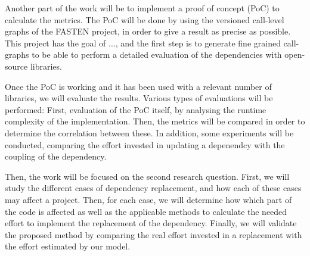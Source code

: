 \documentclass[a4paper]{article}
\begin{document}
Another part of the work will be to implement a proof of concept (PoC) to calculate the metrics. The PoC will be done by using the versioned call-level graphs of the FASTEN project, in order to give a result as precise as possible. This project has the goal of ..., and the first step is to generate fine grained call-graphs to be able to perform a detailed evaluation of the dependencies with open-source libraries.

Once the PoC is working and it has been used with a relevant number of libraries, we will evaluate the results. Various types of evaluations will be performed: First, evaluation of the PoC itself, by analysing the runtime complexity of the implementation. Then, the metrics will be compared in order to determine the correlation between these. In addition, some experiments will be conducted, comparing the effort invested in updating a depenendcy with the coupling of the dependency.

Then, the work will be focused on the second research question. First, we will study the different cases of dependency replacement, and how each of these cases may affect a project. Then, for each case, we will determine how which part of the code is affected as well as the applicable methods to calculate the needed effort to implement the replacement of the dependency. Finally, we will validate the proposed method by comparing the real effort invested in a replacement with the effort estimated by our model.



\end{document}
